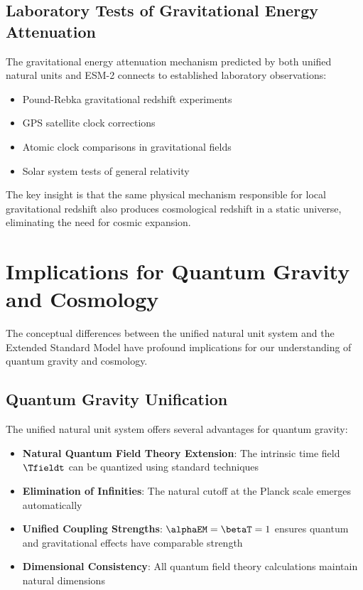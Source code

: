 	\subsection{Laboratory Tests of Gravitational Energy Attenuation}
	\label{subsec:laboratory_tests}
	
	The gravitational energy attenuation mechanism predicted by both unified natural units and ESM-2 connects to established laboratory observations:
	
	\begin{itemize}
		\item Pound-Rebka gravitational redshift experiments \cite{Pound1960}
		\item GPS satellite clock corrections \cite{Ashby2003}
		\item Atomic clock comparisons in gravitational fields \cite{Ludlow2015}
		\item Solar system tests of general relativity \cite{Bertotti2003}
	\end{itemize}
	
	The key insight is that the same physical mechanism responsible for local gravitational redshift also produces cosmological redshift in a static universe, eliminating the need for cosmic expansion.
	
	\section{Implications for Quantum Gravity and Cosmology}
	\label{sec:implications}
	
	The conceptual differences between the unified natural unit system and the Extended Standard Model have profound implications for our understanding of quantum gravity and cosmology.
	
	\subsection{Quantum Gravity Unification}
	\label{subsec:quantum_gravity_unification}
	
	The unified natural unit system offers several advantages for quantum gravity:
	
	\begin{itemize}
		\item \textbf{Natural Quantum Field Theory Extension}: The intrinsic time field $\Tfieldt$ can be quantized using standard techniques
		\item \textbf{Elimination of Infinities}: The natural cutoff at the Planck scale emerges automatically
		\item \textbf{Unified Coupling Strengths}: $\alphaEM = \betaT = 1$ ensures quantum and gravitational effects have comparable strength
		\item \textbf{Dimensional Consistency}: All quantum field theory calculations maintain natural dimensions \cite{pascher_lagrangian_2025}
	\end{itemize}
	
